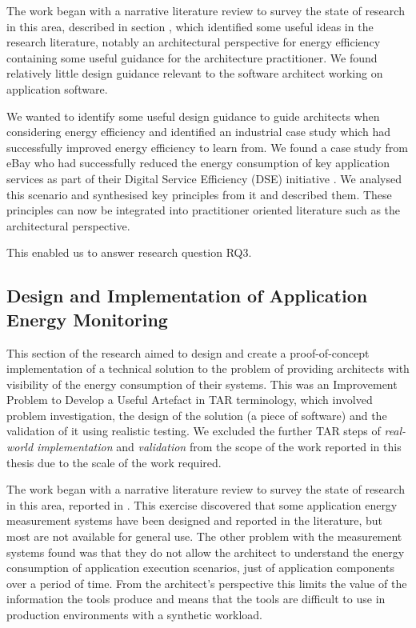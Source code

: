 The work began with a narrative literature review to survey the state of research in this area, described in section , which identified some useful ideas in the research literature, notably an architectural perspective for energy efficiency \cite{jagroep2017-energyperspective} containing some useful guidance for the architecture practitioner.  We found relatively little design guidance relevant to the software architect working on application software.

We wanted to identify some useful design guidance to guide architects when considering energy efficiency and identified an industrial case study which had successfully improved energy efficiency to learn from.  We found a case study from eBay who had successfully reduced the energy consumption of key application services as part of their Digital Service Efficiency (DSE) initiative \cite{ebay2013-digitalefficiency}.  We analysed this scenario and synthesised key principles from it and described them.  These principles can now be integrated into practitioner oriented literature such as the architectural perspective. 

This enabled us to answer research question RQ3.

\subsection{Design and Implementation of Application Energy Monitoring}

This section of the research aimed to design and create a proof-of-concept implementation of a technical solution to the problem of providing architects with visibility of the energy consumption of their systems.  This was an Improvement Problem to Develop a Useful Artefact in TAR terminology, which involved problem investigation, the design of the solution (a piece of software) and the validation of it using realistic testing.  We excluded the further TAR steps of \emph{real-world implementation} and \emph{validation} \cite{wieringa2012-tar} from the scope of the work reported in this thesis due to the scale of the work required.

The work began with a narrative literature review to survey the state of research in this area, reported in .  This exercise discovered that some application energy measurement systems have been designed and reported in the literature, but most are not available for general use.  The other problem with the measurement systems found was that they do not allow the architect to understand the energy consumption of application execution scenarios, just of application components over a period of time.  From the architect's perspective this limits the value of the information the tools produce and means that the tools are difficult to use in production environments with a synthetic workload.

